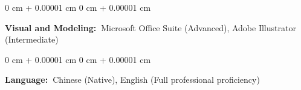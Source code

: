 \documentclass[10pt, letterpaper]{article}
\newenvironment{onecolentry}{
    \begin{adjustwidth}{
        0 cm + 0.00001 cm
    }{
        0 cm + 0.00001 cm
    }
}{
    \end{adjustwidth}
} %
\begin{document}
         \vspace{0.1 cm}

        \begin{onecolentry}
                    \textbf{\textbf{\textbf{Visual and Modeling: }}}Microsoft Office Suite (Advanced), Adobe Illustrator (Intermediate)

        \end{onecolentry}

         \vspace{0.1 cm}

        \begin{onecolentry}
                    \textbf{\textbf{\textbf{\textbf{Language: }}}}Chinese (Native), English (Full professional proficiency) 

        \end{onecolentry}



    
\end{document}
